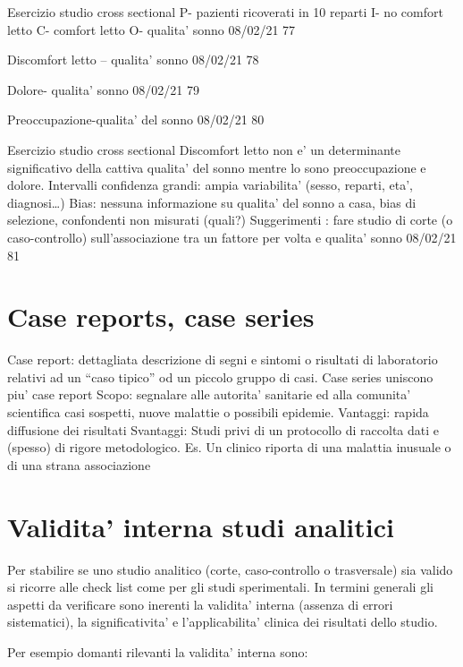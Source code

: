 \documentclass[]{book}
\begin{document}
Esercizio studio cross sectional
P- pazienti ricoverati in 10 reparti I- no comfort letto
C- comfort letto
O- qualita' sonno
08/02/21
77

Discomfort letto -- qualita' sonno
08/02/21
78

Dolore- qualita' sonno
08/02/21
79

Preoccupazione-qualita' del sonno
08/02/21
80

Esercizio studio cross sectional
Discomfort letto non e' un determinante significativo della cattiva qualita' del sonno mentre lo sono preoccupazione e dolore.
Intervalli confidenza grandi: ampia variabilita' (sesso, reparti, eta', diagnosi\ldots{})
Bias: nessuna informazione su qualita' del sonno a casa, bias di selezione, confondenti non misurati (quali?)
Suggerimenti : fare studio di corte (o caso-controllo) sull'associazione tra un fattore per volta e qualita' sonno
08/02/21
81

\hypertarget{case-reports-case-series}{%
\section{Case reports, case series}\label{case-reports-case-series}}

Case report: dettagliata descrizione di segni e sintomi o risultati di laboratorio relativi ad un ``caso tipico'' od un piccolo gruppo di casi. Case series uniscono piu' case report
Scopo: segnalare alle autorita' sanitarie ed alla comunita' scientifica casi sospetti, nuove malattie o possibili epidemie.
Vantaggi: rapida diffusione dei risultati
Svantaggi: Studi privi di un protocollo di raccolta dati e (spesso) di rigore metodologico.
Es. Un clinico riporta di una malattia inusuale o di una strana associazione

\hypertarget{validita-interna-studi-analitici}{%
\section{Validita' interna studi analitici}\label{validita-interna-studi-analitici}}

Per stabilire se uno studio analitico (corte, caso-controllo o trasversale) sia valido si ricorre alle check list come per gli studi sperimentali. In termini generali gli aspetti da verificare sono inerenti la validita' interna (assenza di errori sistematici), la significativita' e l'applicabilita' clinica dei risultati dello studio.

Per esempio domanti rilevanti la validita' interna sono:
\end{document}
